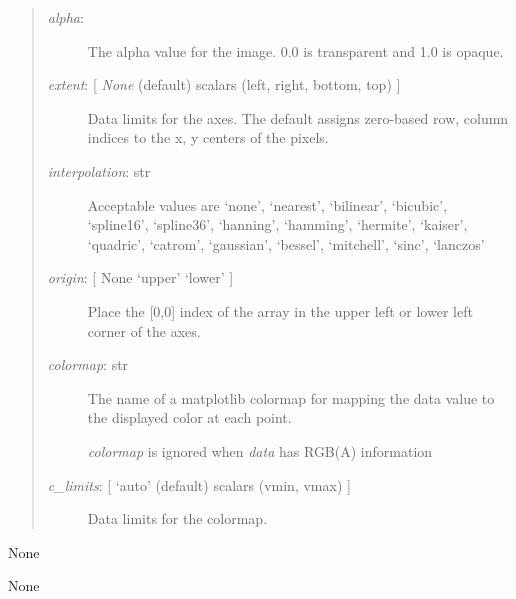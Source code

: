 \documentclass[letterpaper,10pt,english]{sphinxmanual}
\begin{document}
\begin{fulllineitems}
\begin{fulllineitems}
\begin{quote}
\begin{description}
\item[{\emph{alpha}: }] \leavevmode
The alpha value for the image. 0.0 is transparent and 1.0 is opaque.

\item[{\emph{extent}:  {[} \emph{None} (default) \textbar{} scalars (left, right, bottom, top) {]}}] \leavevmode
Data limits for the axes. The default assigns zero-based row, 
column indices to the x, y centers of the pixels.

\item[{\emph{interpolation}: str}] \leavevmode
Acceptable values are `none', `nearest', `bilinear',
`bicubic', `spline16', `spline36', `hanning', `hamming',
`hermite', `kaiser', `quadric', `catrom', `gaussian',
`bessel', `mitchell', `sinc', `lanczos'

\item[{\emph{origin}: {[} None \textbar{} `upper' \textbar{} `lower' {]}}] \leavevmode
Place the {[}0,0{]} index of the array in the upper left or lower left 
corner of the axes.

\item[{\emph{colormap}: str}] \leavevmode
The name of a matplotlib colormap for mapping the data value to the
displayed color at each point.

\emph{colormap} is ignored when \emph{data} has RGB(A) information

\item[{\emph{c\_limits}:  {[} `auto' (default) \textbar{} scalars (vmin, vmax) {]}}] \leavevmode
Data limits for the colormap.

\end{description}
\end{quote}

\end{fulllineitems}


\begin{fulllineitems}
\label{api:mpl.Plot2D.pick_action}
None

\end{fulllineitems}


\begin{fulllineitems}
\label{api:mpl.Plot2D.pop_event}
None

\end{fulllineitems}


\end{fulllineitems}
\end{document}
